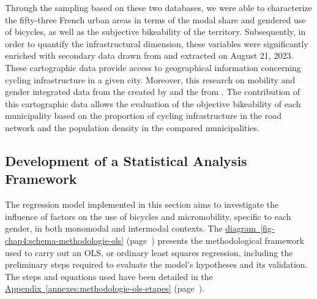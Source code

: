 \begin{refsegment}
Through the sampling based on these two databases, we were able to characterize the fifty-three French urban areas in terms of the modal share and gendered use of bicycles, as well as the subjective bikeability of the territory. Subsequently, in order to quantify the infrastructural dimension, these variables were significantly enriched with secondary data drawn from \textcolor{blue}{\textcite{openstreetmap_openstreetmap_2023}} and extracted on August 21, 2023. These cartographic data provide access to geographical information concerning cycling infrastructure in a given city. Moreover, this research on mobility and gender integrated data from the  created by \textcolor{blue}{\textcite{velo__territoires_atlas_2023}} and the  from \textcolor{blue}{\textcite{insee_grille_2021}}. The contribution of this cartographic data allows the evaluation of the objective bikeability of each municipality based on the proportion of cycling infrastructure in the road network and the population density in the compared municipalities. %

\subsection{Development of a Statistical Analysis Framework
    \label{chap4:methodologie-modele-ols}
    }

The regression model implemented in this section aims to investigate the influence of factors on the use of bicycles and micromobility, specific to each gender, in both monomodal and intermodal contexts. The \hyperref[fig-chap4:schema-methodologie-ols]{diagram~\ref{fig-chap4:schema-methodologie-ols}} (page~\pageref{fig-chap4:schema-methodologie-ols}) presents the methodological framework used to carry out an \acrfull{OLS}, or ordinary least squares regression, including the preliminary steps required to evaluate the model's hypotheses and its validation. The steps and equations used have been detailed in the \hyperref[annexes:methodologie-ols-etapes]{Appendix~\ref{annexes:methodologie-ols-etapes}} (page~\pageref{annexes:methodologie-ols-etapes}). %


\end{refsegment}
